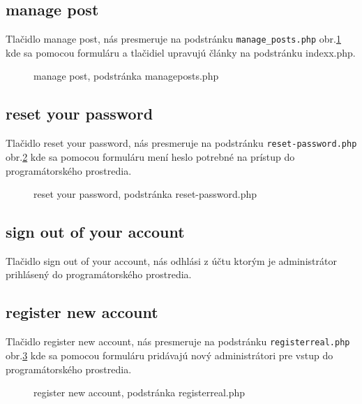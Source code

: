 \subsection{manage post}

Tlačidlo manage post, nás presmeruje na podstránku \verb|manage_posts.php| obr.\ref{OBRAZOK 1.12} kde sa pomocou formuláru a tlačidiel upravujú články na podstránku indexx.php.

\begin{figure}[!tbh]
\centering
\setlength{\fboxsep}{0pt}%
\setlength{\fboxrule}{1pt}%
\caption{manage post, podstránka manageposts.php}\label{OBRAZOK 1.12}
\end{figure}

\subsection{reset your password}

Tlačidlo reset your password, nás presmeruje na podstránku \verb|reset-password.php| obr.\ref{OBRAZOK 1.13} kde sa pomocou formuláru mení heslo potrebné na prístup do programátorského prostredia.

\begin{figure}[!tbh]
\centering
\setlength{\fboxsep}{0pt}%
\setlength{\fboxrule}{1pt}%
\caption{reset your password, podstránka reset-password.php}\label{OBRAZOK 1.13}
\end{figure}

\subsection{sign out of your account}

Tlačidlo sign out of your account, nás odhlási z účtu ktorým je administrátor prihlásený do programátorského prostredia.

\pagebreak

\subsection{register new account}

Tlačidlo register new account, nás presmeruje na podstránku \verb|registerreal.php| obr.\ref{OBRAZOK 1.14} kde sa pomocou formuláru pridávajú nový administrátori pre vstup do programátorského prostredia.

\begin{figure}[!tbh]
\centering
\setlength{\fboxsep}{0pt}%
\setlength{\fboxrule}{1pt}%
\caption{register new account, podstránka registerreal.php}\label{OBRAZOK 1.14}
\end{figure}

